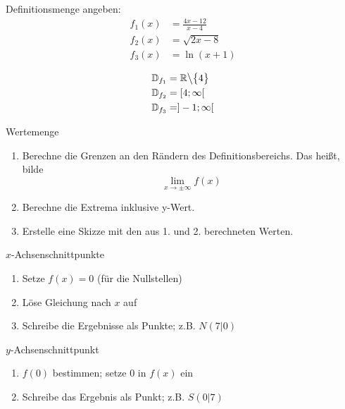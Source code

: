 \documentclass[paper=a6,ngerman,twoside=true,fontsize=14pt, parskip = half]{scrartcl}
\begin{document}
\begin{frage}
	Definitionsmenge angeben:
	\begin{align*}
	     f_1(x)&=\frac{4x-12}{x-4} \\
		 f_2(x)&=\sqrt{2x-8}\\
		 f_3(x)&=\ln(x+1)
	\end{align*}
\end{frage}
\begin{antwort}
	\begin{align*}
	   	  \mathbb{D}_{f_1}&=\mathbb{R}\big\backslash\big\{4\big\} \\
		  \mathbb{D}_{f_2}&=[4;\infty[ \\
		  \mathbb{D}_{f_3}&=]-1;\infty[ 
	\end{align*}
\end{antwort}
\begin{frage}
	Wertemenge
\end{frage}
\begin{antwort}
	\begin{enumerate}
		\item Berechne die Grenzen an den Rändern des Definitionsbereichs.
			Das heißt, bilde
			\[\lim\limits_{x \rightarrow\pm\infty}{f(x)}\]
		\item Berechne die Extrema inklusive y-Wert.
		\item Erstelle eine Skizze mit den aus 1. und 2. berechneten Werten.
	\end{enumerate}
\end{antwort}
\begin{frage}
	$x$-Achsenschnittpunkte
\end{frage}
\begin{antwort}
	\begin{enumerate}
		\item Setze $f(x)=0$ (für die Nullstellen)
		\item Löse Gleichung nach $x$ auf
		\item Schreibe die Ergebnisse als Punkte; 
			z.B. $N(7|0)$
	\end{enumerate}
\end{antwort}
\begin{frage}
	$y$-Achsenschnittpunkt
\end{frage}
\begin{antwort}
	\begin{enumerate}
		\item $f(0)$ bestimmen; setze $0$ in $f(x)$ ein
		\item Schreibe das Ergebnis als Punkt; 
			z.B. $S(0|7)$
	\end{enumerate}
\end{antwort}
\end{document}
